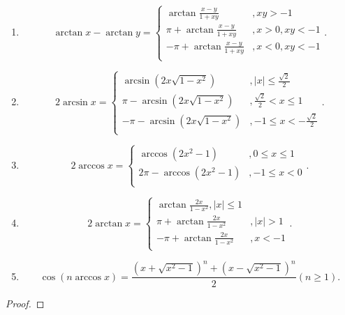\documentclass[../../main.tex]{subfiles}
\begin{document}
\begin{theorem}[常用反三角函数性质]
\begin{enumerate}
\item $$\arctan x-\arctan y=\begin{cases}
\arctan \frac{x-y}{1+xy}&,xy>-1\\
\pi +\arctan \frac{x-y}{1+xy}&,x>0,xy<-1\\
-\pi +\arctan \frac{x-y}{1+xy}&,x<0,xy<-1\\
\end{cases}.$$

\item $$2\arcsin x=\begin{cases}
\arcsin \left( 2x\sqrt{1-x^2} \right) &,\left| x \right|\leqslant \frac{\sqrt{2}}{2}\\
\pi -\arcsin \left( 2x\sqrt{1-x^2} \right) &,\frac{\sqrt{2}}{2}<x\leqslant 1\\
-\pi -\arcsin \left( 2x\sqrt{1-x^2} \right) &,-1\leqslant x<-\frac{\sqrt{2}}{2}\\
\end{cases}.$$

\item $$2\arccos x=\begin{cases}
\arccos \left( 2x^2-1 \right) &,0\leqslant x\leqslant 1\\
2\pi -\arccos \left( 2x^2-1 \right) &,-1\leqslant x<0\\
\end{cases}.$$

\item $$2\arctan x=\begin{cases}
\arctan \frac{2x}{1-x^2},\left| x \right|\leqslant 1\\
\pi +\arctan \frac{2x}{1-x^2}&,\left| x \right|>1\\
-\pi +\arctan \frac{2x}{1-x^2}&,x<-1\\
\end{cases}.$$

\item $$\cos \left( n\arccos x \right) =\frac{\left( x+\sqrt{x^2-1} \right) ^n+\left( x-\sqrt{x^2-1} \right) ^n}{2}\left( n\geqslant 1 \right) .$$
\end{enumerate}
\end{theorem}
\begin{proof}


\end{proof}
\end{document}
